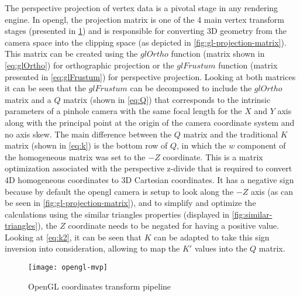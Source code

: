 The perspective projection of vertex data is a pivotal stage in any rendering engine. In \gls{opengl}, the projection matrix is one of the 4 main vertex transform stages (presented in \cref{fig:opengl-mvp}) and is responsible for converting 3D geometry from the camera space into the clipping space (as depicted in \cref{fig:gl-projection-matrix}). This matrix can be created using the $glOrtho$ function (matrix shown in \cref{eq:glOrtho}) for orthographic projection or the $glFrustum$ function (matrix presented in \cref{eq:glFrustum}) for perspective projection. Looking at both matrices it can be seen that the $glFrustum$ can be decomposed to include the $glOrtho$ matrix and a $Q$ matrix (shown in \cref{eq:Q}) that corresponds to the intrinsic parameters of a pinhole camera with the same focal length for the $X$ and $Y$ axis along with the principal point at the origin of the camera coordinate system and no axis skew. The main difference between the $Q$ matrix and the traditional $K$ matrix \cite{Hartley2003} (shown in \cref{eq:k}) is the bottom row of $Q$, in which the $w$ component of the homogeneous matrix was set to the $-Z$ coordinate. This is a matrix optimization associated with the perspective z-divide that is required to convert 4D homogeneous coordinates to 3D Cartesian coordinates. It has a negative sign because by default the \gls{opengl} camera is setup to look along the $-Z$ axis (as can be seen in \cref{fig:gl-projection-matrix}), and to simplify and optimize the calculations using the similar triangles properties (displayed in \cref{fig:similar-triangles}), the $Z$ coordinate needs to be negated for having a positive value. Looking at \cref{eq:k2}, it can be seen that $K$ can be adapted to take this sign inversion into consideration, allowing to map the $K'$ values into the $Q$ matrix.

\vspace{-0.3em}
\begin{figure}[H]
	\centering
	\texttt{[image: opengl-mvp]}
	\caption[OpenGL rendering pipeline]{OpenGL coordinates transform pipeline\protect\footnotemark}
	\label{fig:opengl-mvp}
	\vspace{-0.7em}
\end{figure}
\vspace{-1em}

